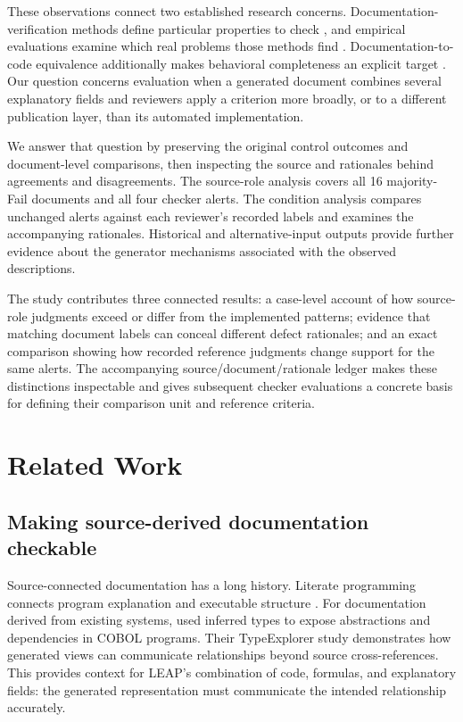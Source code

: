 \documentclass[a4paper,fleqn]{cas-dc}
\begin{document}
These observations connect two established research concerns. Documentation-verification methods define particular properties to check \citep{KuhnBergel2014,Lozano2015}, and empirical evaluations examine which real problems those methods find \citep{HabibPradel2018}. Documentation-to-code equivalence additionally makes behavioral completeness an explicit target \citep{Eghbali2026}. Our question concerns evaluation when a generated document combines several explanatory fields and reviewers apply a criterion more broadly, or to a different publication layer, than its automated implementation.

We answer that question by preserving the original control outcomes and document-level comparisons, then inspecting the source and rationales behind agreements and disagreements. The source-role analysis covers all 16 majority-Fail documents and all four checker alerts. The condition analysis compares unchanged alerts against each reviewer's recorded labels and examines the accompanying rationales. Historical and alternative-input outputs provide further evidence about the generator mechanisms associated with the observed descriptions.

The study contributes three connected results: a case-level account of how source-role judgments exceed or differ from the implemented patterns; evidence that matching document labels can conceal different defect rationales; and an exact comparison showing how recorded reference judgments change support for the same alerts. The accompanying source/document/rationale ledger makes these distinctions inspectable and gives subsequent checker evaluations a concrete basis for defining their comparison unit and reference criteria.

\section{Related Work}
\subsection{Making source-derived documentation checkable}
Source-connected documentation has a long history. Literate programming connects program explanation and executable structure \citep{Knuth1984}. For documentation derived from existing systems, \citet{VanDeursenMoonen2006} used inferred types to expose abstractions and dependencies in COBOL programs. Their TypeExplorer study demonstrates how generated views can communicate relationships beyond source cross-references. This provides context for LEAP's combination of code, formulas, and explanatory fields: the generated representation must communicate the intended relationship accurately.
\end{document}
